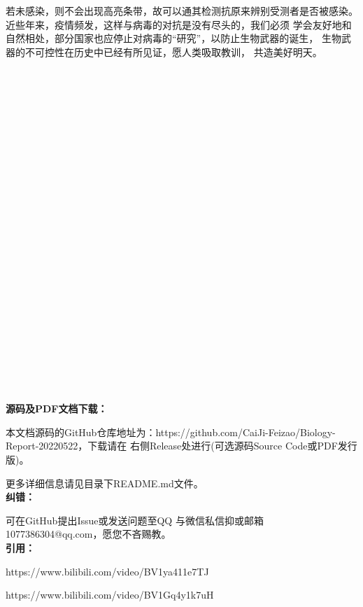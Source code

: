 \documentclass[UTF8,a4paper,11 pt]{ctexart}
\begin{document}
	若未感染，则不会出现高亮条带，故可以通其检测抗原来辨别受测者是否被感染。
	\clearpage
	近些年来，疫情频发，这样与病毒的对抗是没有尽头的，我们必须
	学会友好地和自然相处，部分国家也应停止对病毒的“研究”，以防止生物武器的诞生，
	生物武器的不可控性在历史中已经有所见证，愿人类吸取教训，
	共造美好明天。
	\\\,\\\,\\\,\\\,\\\,\\\,\\\,
	\\\,\\\,\\\,\\\,\\\,\\\,\\\,
	\\\,\\\,\\\,\\\,\\\,\\\,\\\,
	\\\,\\\,\\\,\\\,
	\\\textbf{源码及PDF文档下载：}
	
	本文档源码的GitHub仓库地址为：https://github.com/CaiJi-Feizao/Biology-Report-20220522，下载请在
	右侧Release处进行(可选源码Source Code或PDF发行版)。
	
	更多详细信息请见目录下README.md文件。
	\\\textbf{纠错：}
	
	可在GitHub提出Issue或发送问题至QQ
	与微信私信抑或邮箱1077386304@qq.com，愿您不吝赐教。
	\\\textbf{引用：}
	
	https://www.bilibili.com/video/BV1ya411e7TJ
	
	https://www.bilibili.com/video/BV1Gq4y1k7uH
\end{document}
